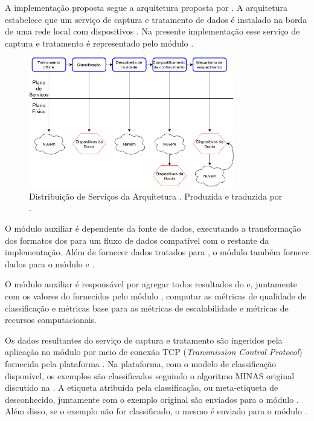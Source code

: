 
A implementação proposta segue a arquitetura \idsiot proposta por
.
A arquitetura \idsiot estabelece que um serviço de captura e tratamento de dados
é instalado na borda de uma rede local com dispositivos \iot.
Na presente implementação
esse serviço de captura e tratamento é representado pelo módulo \source.

\begin{figure}[ht]
  \centering
  \includegraphics[width=0.8\textwidth]{figuras/cassales-service-physical-pt.png}
  \caption{
    Distribuição de Serviços da Arquitetura \idsiot.
    Produzida e traduzida por .
  }
  \label{fig:ids-iot}
\end{figure}

O módulo auxiliar \source é dependente da fonte de dados, executando a transformação dos
formatos dos \datasets para um fluxo de dados compatível com o restante da
implementação.
Além de fornecer dados tratados para \mfog, o módulo \source também fornece
dados para o módulo \sink e \offline.

O módulo auxiliar \sink é responsável por agregar todos resultados do \mfog e,
juntamente com os valores do \dataset fornecidos pelo módulo \source, computar
as métricas de qualidade de classificação e métricas base para as métricas de
escalabilidade e métricas de recursos computacionais.

Os dados resultantes do serviço de captura e tratamento são ingeridos pela
aplicação no módulo \classify por meio de conexão TCP (\emph{Transmission
Control Protocol}) fornecida pela plataforma \flink.
Na plataforma, com o modelo de classificação disponível, os exemplos são
classificados seguindo o algoritmo MINAS original discutido na .
A etiqueta atribuída pela classificação, ou meta-etiqueta de desconhecido,
juntamente com o exemplo original são enviados para o módulo \sink.
Além disso, se o exemplo não for classificado, o mesmo é enviado para o módulo
\detector.

